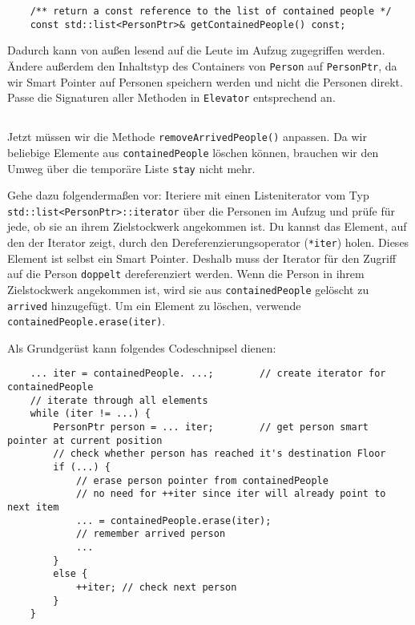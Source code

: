 \begin{lstlisting}
	/** return a const reference to the list of contained people */
	const std::list<PersonPtr>& getContainedPeople() const;
\end{lstlisting}

Dadurch kann von außen lesend auf die Leute im Aufzug zugegriffen werden.
Ändere außerdem den Inhaltstyp des Containers von \texttt{Person} auf \texttt{PersonPtr}, da wir Smart Pointer auf Personen speichern werden und nicht die Personen direkt.
Passe die Signaturen aller Methoden in \texttt{Elevator} entsprechend an.

\subsection{}
Jetzt müssen wir die Methode \texttt{removeArrivedPeople()} anpassen.
Da wir beliebige Elemente aus \texttt{containedPeople} löschen können, brauchen wir den Umweg über die temporäre Liste \texttt{stay} nicht mehr.

Gehe dazu folgendermaßen vor:
Iteriere mit einen Listeniterator vom Typ \texttt{std::list<PersonPtr>::iterator} über die Personen im Aufzug und prüfe für jede, ob sie an ihrem Zielstockwerk angekommen ist.
Du kannst das Element, auf den der Iterator zeigt, durch den Dereferenzierungsoperator (\texttt{*iter}) holen.
Dieses Element ist selbst ein Smart Pointer.
Deshalb muss der Iterator für den Zugriff auf die Person \texttt{doppelt} dereferenziert werden.
Wenn die Person in ihrem Zielstockwerk angekommen ist, wird sie aus \texttt{containedPeople} gelöscht zu \texttt{arrived} hinzugefügt.
Um ein Element zu löschen, verwende \texttt{containedPeople.erase(iter)}.


Als Grundgerüst kann folgendes Codeschnipsel dienen:

\begin{lstlisting}
	... iter = containedPeople. ...;		// create iterator for containedPeople
	// iterate through all elements
	while (iter != ...) {
		PersonPtr person = ... iter; 		// get person smart pointer at current position
		// check whether person has reached it's destination Floor
		if (...) {
			// erase person pointer from containedPeople
			// no need for ++iter since iter will already point to next item
			... = containedPeople.erase(iter);
			// remember arrived person
			...
		}
		else {
			++iter; // check next person
		}
	}
\end{lstlisting}

